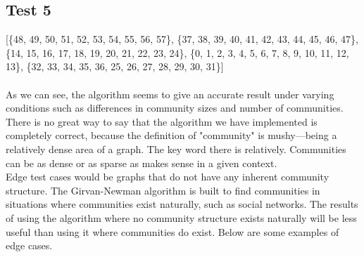 \documentclass{article}
\begin{document}
\subsection{Test 5}
    \begin{center}
    \end{center}
    [\{48, 49, 50, 51, 52, 53, 54, 55, 56, 57\}, \{37, 38, 39, 40, 41, 42, 43, 44, 45, 46, 47\}, \{14, 15, 16, 17, 18, 19, 20, 21, 22, 23, 24\}, \{0, 1, 2, 3, 4, 5, 6, 7, 8, 9, 10, 11, 12, 13\}, \{32, 33, 34, 35, 36, 25, 26, 27, 28, 29, 30, 31\}]
\\ \\
As we can see, the algorithm seems to give an accurate result under varying conditions such as differences in community sizes and number of communities.  There is no great way to say that the algorithm we have implemented is completely correct, because the definition of "community" is mushy---being a relatively dense area of a graph.  The key word there is relatively.  Communities can be as dense or as sparse as makes sense in a given context. \\

Edge test cases would be graphs that do not have any inherent community structure.  The Girvan-Newman algorithm is built to find communities in situations where communities exist naturally, such as social networks.  The results of using the algorithm where no community structure exists naturally will be less useful than using it where communities do exist.  Below are some examples of edge cases.
\end{document}
